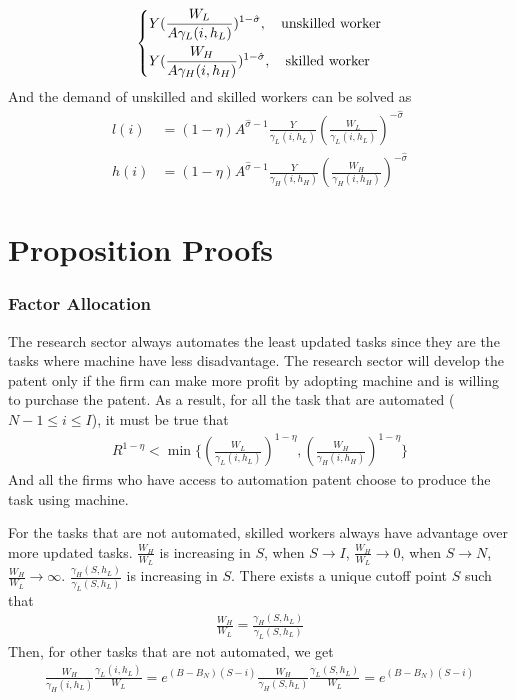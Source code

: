 \documentclass[12pt]{article}
\begin{document}
\begin{appendices}
\begin{align*}
\begin{dcases}
Y(\frac{W_L}{A\gamma_L(i,h_L)})^{1-\hat{\sigma}}, \quad \text{unskilled worker}  \\
Y(\frac{W_H}{A\gamma_H(i,h_H)})^{1-\hat{\sigma}}, \quad \text{skilled worker}
\end{dcases}
\end{align*}
And the demand of unskilled and skilled workers can be solved as 
\begin{align*}
l(i) &= (1-\eta)A^{\hat{\sigma}-1}\frac{Y}{\gamma_L(i,h_L)}(\frac{W_L}{\gamma_L(i,h_L)})^{-\hat{\sigma}} \\
h(i) &= (1-\eta)A^{\hat{\sigma}-1}\frac{Y}{\gamma_H(i,h_H)}(\frac{W_H}{\gamma_H(i,h_H)})^{-\hat{\sigma}} 
\end{align*}
 
\section{Proposition Proofs}

\subsubsection*{Factor Allocation}
The research sector always automates the least updated tasks since they are the tasks where machine have less disadvantage. The research sector will develop the patent only if the firm can make more profit by adopting machine and is willing to purchase the patent. As a result, for all the task that are automated ($N-1 \le i \le I$), it must be true that 
\begin{align*}
R^{1-\eta} < \min \{(\frac{W_L}{\gamma_L(i,h_L)})^{1-\eta},(\frac{W_H}{\gamma_H(i,h_H)})^{1-\eta}\}
\end{align*}
And all the firms who have access to automation patent choose to produce the task using machine. 

For the tasks that are not automated, skilled workers always have advantage over more updated tasks. $\frac{W_H}{W_L}$ is increasing in $S$, when $S\to I$, $\frac{W_H}{W_L}\to 0$, when $S\to N$, $\frac{W_H}{W_L}\to \infty$. $ \frac{\gamma_H(S,h_L)}{\gamma_L(S,h_L)}$ is increasing in $S$. There exists a unique cutoff point $S$ such that 
\begin{align*}
\frac{W_H}{W_L} = \frac{\gamma_H(S,h_L)}{\gamma_L(S,h_L)}
\end{align*}
Then, for other tasks that are not automated, we get 
\begin{align*}
\frac{W_H}{\gamma_H(i,h_L)}\frac{\gamma_L(i,h_L)}{W_L} = e^{(B-B_N)(S-i)}\frac{W_H}{\gamma_H(S,h_L)}\frac{\gamma_L(S,h_L)}{W_L} =  e^{(B-B_N)(S-i)}
\end{align*}


\end{appendices}
\end{document}
